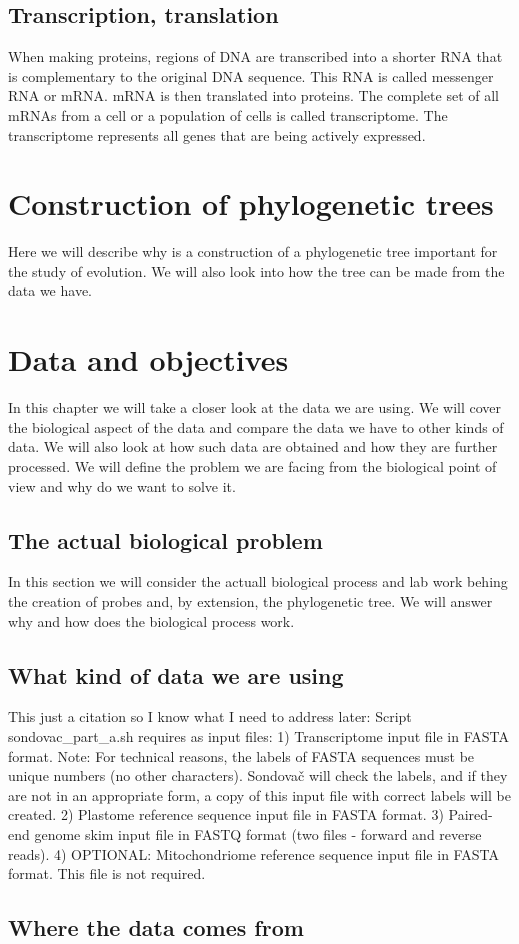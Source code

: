 \subsection{Transcription, translation}%
When making proteins, regions of DNA are transcribed into a shorter RNA that is complementary to the original DNA sequence. 
This RNA is called messenger RNA or mRNA. mRNA is then translated into proteins. The complete set of all mRNAs from a 
cell or a population of cells is called transcriptome. The transcriptome represents all genes that are being actively expressed. 

\section{Construction of phylogenetic trees}

Here we will describe why is a construction of a phylogenetic tree important for the study of evolution. We will also look 
into how the tree can be made from the data we have. 

\section[Data and objectives]{Data and objectives}

In this chapter we will take a closer look at the data we are using. We will cover the biological aspect of 
the data and compare the data we have to other kinds of data. We will also look at how such data are obtained 
and how they are further processed. We will define the problem we are facing from the biological point of view and 
why do we want to solve it. 

\subsection{The actual biological problem}

In this section we will consider the actuall biological process and lab work behing the creation of probes and, by extension, 
the phylogenetic tree. We will answer why and how does the biological process work. 

\subsection{What kind of data we are using}
This just a citation so I know what I need to address later:
Script sondovac\_part\_a.sh requires as input files:
1) Transcriptome input file in FASTA format. Note: For technical reasons, the 
   labels of FASTA sequences must be unique numbers (no other characters). 
   Sondovač will check the labels, and if they are not in an appropriate form, 
   a copy of this input file with correct labels will be created.
2) Plastome reference sequence input file in FASTA format.
3) Paired-end genome skim input file in FASTQ format (two files - forward and 
   reverse reads).
4) OPTIONAL: Mitochondriome reference sequence input file in FASTA format.
   This file is not required.
\cite{sondovac}

\subsection{Where the data comes from}



